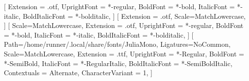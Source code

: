 \usepackage[english]{babel}

\usepackage{amsmath,amssymb,amsfonts}
\usepackage[utf8]{inputenc}

\usepackage{fontspec}
\usepackage{unicode-math}
\setmainfont{texgyretermes}[
	Extension = .otf,
	UprightFont = *-regular,
	BoldFont = *-bold,
	ItalicFont = *-italic,
	BoldItalicFont = *-bolditalic,
]
[
	Extension = .otf,
	Scale=MatchLowercase,
]
\setsansfont{texgyreheros}[
	Scale=MatchLowercase,
	Extension = .otf,
	UprightFont = *-regular,    
	BoldFont = *-bold,
	ItalicFont = *-italic,
	BoldItalicFont = *-bolditalic,
]
\setmonofont{JuliaMono}[
    Path=/home/runner/.local/share/fonts/JuliaMono,
	Ligatures=NoCommon,
	Scale=MatchLowercase,
	Extension = .ttf,
	UprightFont = *-Regular,
	BoldFont = *-SemiBold,
	ItalicFont = *-RegularItalic,
	BoldItalicFont = *-SemiBoldItalic,
	Contextuals = Alternate,
	CharacterVariant = 1,
]

\usepackage{lastpage}

\usepackage{gensymb}

\usepackage{setspace}

\usepackage{ccicons}

\usepackage[hang,flushmargin]{footmisc}

\usepackage{geometry}

\setlength{\parindent}{0pt}
\setlength{\parskip}{6pt plus 2pt minus 1pt}

\usepackage{fancyhdr}
\renewcommand{\headrulewidth}{0pt}